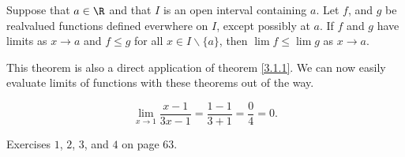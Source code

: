 \begin{theorem}\label{3.1.5}
   Suppose that $a \in \R$ and that $I$ is an open interval containing  $a$. Let 
   $f$, and $g$ be realvalued functions defined everwhere on  $I$, except possibly 
   at  $a$. If $f$ and  $g$ have limits as  $x \rightarrow a$ and  $f \leq g$ for all $x \in I \backslash \{a\}$, 
   then $\lim{f} \leq \lim{g}$ as  $x \rightarrow a$.
\end{theorem}

This theorem is also a direct application of theorem \ref{3.1.1}. We can now 
easily evaluate limits of functions with these theorems out of the way.

\begin{example}
    \begin{equation*}
        \lim_{x \rightarrow 1}{\frac{x-1}{3x-1}}=\frac{1-1}{3+1}=\frac{0}{4}=0.
    \end{equation*}
\end{example} 

\begin{HW} 
    Exercises $1$,  $2$, $3$, and  $4$ on page $63$.	
\end{HW}
